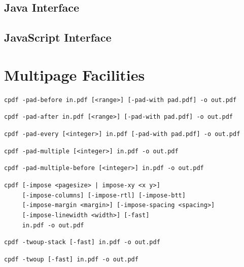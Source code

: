 \documentclass{book}
\begin{document}
\begin{jcpdflib}
\clearpage
\section*{Java Interface}
\begin{small}\tt

\end{small}
\end{jcpdflib}

\begin{jscpdflib}
\clearpage
\section*{JavaScript Interface}
\begin{small}\tt

\end{small}
\end{jscpdflib}

\chapter{Multipage Facilities}\pagestyle{fancy}\label{multipage}\label{chap:9}
  \begin{framed}
    \small\noindent\verb!cpdf -pad-before in.pdf [<range>] [-pad-with pad.pdf] -o out.pdf!

    \vspace{1.5mm}
    \small\noindent\verb!cpdf -pad-after in.pdf [<range>] [-pad-with pad.pdf] -o out.pdf!

    \vspace{1.5mm}
    \small\noindent\verb!cpdf -pad-every [<integer>] in.pdf [-pad-with pad.pdf] -o out.pdf!

    \vspace{1.5mm}
    \small\noindent\verb!cpdf -pad-multiple [<integer>] in.pdf -o out.pdf!

    \vspace{1.5mm}
    \small\noindent\verb!cpdf -pad-multiple-before [<integer>] in.pdf -o out.pdf!

    \vspace{1.5mm}
    \small\noindent\verb!cpdf [-impose <pagesize> | impose-xy <x y>]!\\
    \small\noindent\verb!     [-impose-columns] [-impose-rtl] [-impose-btt]!\\
    \small\noindent\verb!     [-impose-margin <margin>] [-impose-spacing <spacing>]!\\
    \small\noindent\verb!     [-impose-linewidth <width>] [-fast]!\\
    \small\noindent\verb!     in.pdf -o out.pdf!

    \vspace{1.5mm}
    \small\noindent\verb!cpdf -twoup-stack [-fast] in.pdf -o out.pdf! 

    \vspace{1.5mm}
    \small\noindent\verb!cpdf -twoup [-fast] in.pdf -o out.pdf! 

  \end{framed}
\end{document}

